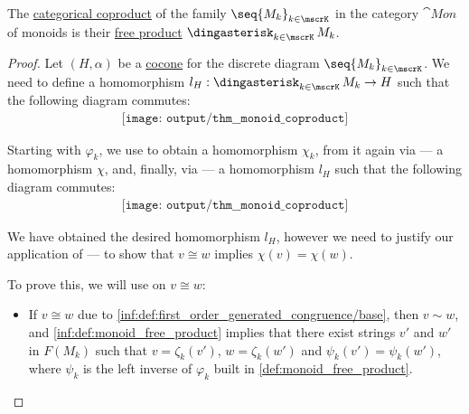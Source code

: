 \begin{proposition}\label{thm:monoid_coproduct}
  The \hyperref[def:discrete_category_limits]{categorical coproduct} of the family \( \seq{ M_k }_{k \in \mscrK} \) in the category \hyperref[def:monoid/category]{\( \cat{Mon} \)} of monoids is their \hyperref[def:monoid_free_product]{free product} \( \Ast_{k \in \mscrK} M_k \).
\end{proposition}
\begin{proof}
  Let \( (H, \alpha) \) be a \hyperref[def:category_of_cones/cocone]{cocone} for the discrete diagram \( \seq{ M_k }_{k \in \mscrK} \). We need to define a homomorphism \( l_H: \Ast_{k \in \mscrK} M_k \to H \) such that the following diagram commutes:
  \begin{equation*}
    \begin{aligned}
      \texttt{[image: output/thm\_\_monoid\_coproduct]}
    \end{aligned}
  \end{equation*}

  Starting with \( \varphi_k \), we use  to obtain a homomorphism \( \chi_k \), from it again via  --- a homomorphism \( \chi \), and, finally, via  --- a homomorphism \( l_H \) such that the following diagram commutes:
  \begin{equation*}
    \begin{aligned}
      \texttt{[image: output/thm\_\_monoid\_coproduct]}
    \end{aligned}
  \end{equation*}

  We have obtained the desired homomorphism \( l_H \), however we need to justify our application of  --- to show that \( v \cong w \) implies \( \chi(v) = \chi(w) \).

  To prove this, we will use  on \( v \cong w \):
  \begin{itemize}
    \item If \( v \cong w \) due to \ref{inf:def:first_order_generated_congruence/base}, then \( v \sim w \), and \ref{inf:def:monoid_free_product} implies that there exist strings \( v' \) and \( w' \) in \( F(M_k) \)  such that \( v = \zeta_k(v') \), \( w = \zeta_k(w') \) and \( \psi_k(v') = \psi_k(w') \), where \( \psi_k \) is the left inverse of \( \varphi_k \) built in \cref{def:monoid_free_product}.


\end{itemize}
\end{proof}
